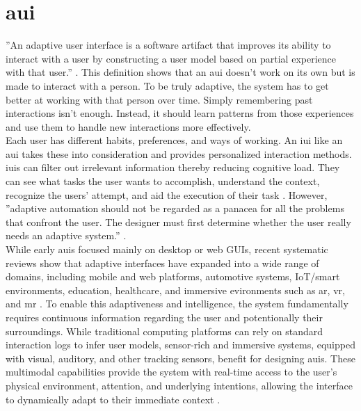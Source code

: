 \section{\gls{aui}}
''An adaptive user interface is a software artifact that improves its ability to interact with a user by constructing a user model based on partial experience with that user.'' \cite{Langley_09_AdaptiveInterfacesDefinition}.
This definition shows that an \gls{aui} doesn’t work on its own but is made to interact with a person. To be truly adaptive, the system has to get better at working with that person over time. Simply remembering past interactions isn’t enough. Instead, it should learn patterns from those experiences and use them to handle new interactions more effectively.\\
Each user has different habits, preferences, and ways of working. An \gls{iui} like an \gls{aui} takes these into consideration and provides personalized interaction methods. \glspl{iui} can filter out irrelevant information thereby reducing cognitive load. They can see what tasks the user wants to accomplish, understand the context, recognize the users' attempt, and aid the execution of their task \cite{Alvarez_09_IUIChallengesBenefits}.
However, ''adaptive automation should not be regarded as a panacea for all the problems that confront the user. The designer must first determine whether the user really needs an adaptive system.'' \cite{Roth_02_DownsidesAUI}.\\
While early \glspl{aui} focused mainly on desktop or web GUIs, recent systematic reviews show that adaptive interfaces have expanded into a wide range of domains, including mobile and web platforms, automotive systems, IoT/smart environments, education, healthcare, and immersive evironments such as \gls{ar}, \gls{vr}, and \gls{mr} \cite{Kristic_25_AUIOverviewAndApplications, Kourtesis_24_XRApplicationAUI}.
To enable this adaptiveness and intelligence, the system fundamentally requires continuous information regarding the user and potentionally their surroundings. While traditional computing platforms can rely on standard interaction logs to infer user models, sensor-rich and immersive systems, equipped with visual, auditory, and other tracking sensors, benefit for designing \glspl{aui}. These multimodal capabilities provide the system with real-time access to the user's physical environment, attention, and underlying intentions, allowing the interface to dynamically adapt to their immediate context \cite{Evangel_22_AdaptiveInXR, Suzuki_23_XRandAIDirections}.
